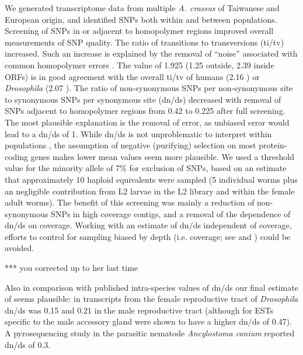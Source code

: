 \documentclass[10pt]{bmc_article}
\newenvironment{bmcformat}{\begin{raggedright}\baselineskip20pt\sloppy\setboolean{publ}{false}}{\end{raggedright}\baselineskip20pt\sloppy}
\begin{document}
\begin{bmcformat}
We generated transcriptome data from multiple \textit{A. crassus} of
Taiwanese and European origin, and identified SNPs both within and
between populations. Screening of SNPs in or adjacent to homopolymer
regions improved overall measurements of SNP quality. The ratio of
transitions to transversions (ti/tv) increased. Such an increase is
explained by the removal of “noise” associated with common homopolymer
errors \cite{pmid21685085}. The value of
1.925 (1.25 outside,
2.39 inside ORFs) is in good agreement with the
overall ti/tv of humans (2.16 \cite{pmid21169219}) or
\textit{Drosophila} (2.07 \cite{pmid21143862}). The ratio of
non-synonymous SNPs per non-synonymous site to synonymous SNPs per
synonymous site (dn/ds) decreased with removal of SNPs adjacent to
homopolymer regions from 0.42 to
0.225 after full screening. The most
plausible explanation is the removal of error, as unbiased error would
lead to a dn/ds of 1. While dn/ds is not unproblematic to interpret
within populations \cite{pmid19081788}, the assumption of negative
(purifying) selection on most protein-coding genes makes lower mean
values seem more plausible. We used a threshold value for the minority
allele of 7\% for exclusion of SNPs, based on an estimate that
approximately 10 haploid equivalents were sampled (5 individual worms
plus an negligible contribution from L2 larvae in the L2 library and
within the female adult worms). The benefit of this screening was
mainly a reduction of non-synonymous SNPs in high coverage contigs,
and a removal of the dependence of dn/ds on coverage. Working with an
estimate of dn/ds independent of coverage, efforts to control for
sampling biased by depth (i.e. coverage; see \cite{pmid18590545} and
\cite{pmid20478048}) could be avoided.

*** you corrected up to her last time

Also in comparison with published intra-species values of dn/ds our
final estimate of seems plausible: in transcripts from the female
reproductive tract of \textit{Drosophila} dn/ds was 0.15
\cite{pmid15579698} and 0.21 in the male reproductive tract
\cite{pmid11404480} (although for ESTs specific to the male accessory
gland were shown to have a higher dn/ds of 0.47). A pyrosequencing
study in the parasitic nematode \textit{Ancylostoma canium}
\cite{pmid20470405} reported dn/ds of 0.3.


\end{bmcformat}
\end{document}

